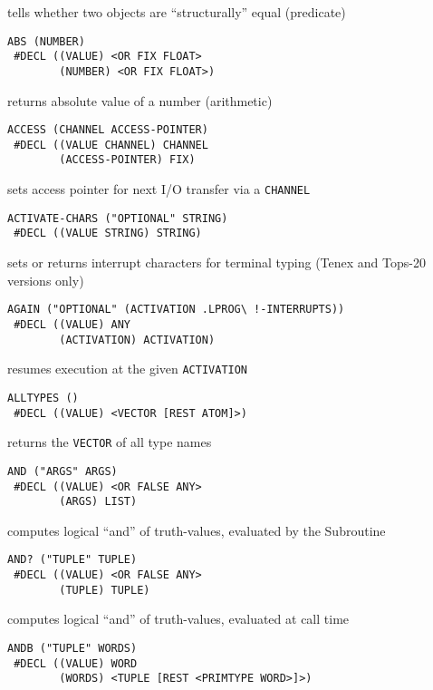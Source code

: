 \documentclass[a4paper]{scrbook}
\begin{document}
tells whether two objects are ``structurally'' equal (predicate)

\begin{verbatim}
ABS (NUMBER)
 #DECL ((VALUE) <OR FIX FLOAT>
        (NUMBER) <OR FIX FLOAT>)
\end{verbatim}

returns absolute value of a number (arithmetic)

\begin{verbatim}
ACCESS (CHANNEL ACCESS-POINTER)
 #DECL ((VALUE CHANNEL) CHANNEL
        (ACCESS-POINTER) FIX)
\end{verbatim}

sets access pointer for next I/O transfer via a \texttt{CHANNEL}

\begin{verbatim}
ACTIVATE-CHARS ("OPTIONAL" STRING)
 #DECL ((VALUE STRING) STRING)
\end{verbatim}

sets or returns interrupt characters for terminal typing (Tenex and Tops-20
versions only)

\begin{verbatim}
AGAIN ("OPTIONAL" (ACTIVATION .LPROG\ !-INTERRUPTS))
 #DECL ((VALUE) ANY
        (ACTIVATION) ACTIVATION)
\end{verbatim}

resumes execution at the given \texttt{ACTIVATION}

\begin{verbatim}
ALLTYPES ()
 #DECL ((VALUE) <VECTOR [REST ATOM]>)
\end{verbatim}

returns the \texttt{VECTOR} of all type names

\begin{verbatim}
AND ("ARGS" ARGS)
 #DECL ((VALUE) <OR FALSE ANY>
        (ARGS) LIST)
\end{verbatim}

computes logical ``and'' of truth-values, evaluated by the Subroutine

\begin{verbatim}
AND? ("TUPLE" TUPLE)
 #DECL ((VALUE) <OR FALSE ANY>
        (TUPLE) TUPLE)
\end{verbatim}

computes logical ``and'' of truth-values, evaluated at call time

\begin{verbatim}
ANDB ("TUPLE" WORDS)
 #DECL ((VALUE) WORD
        (WORDS) <TUPLE [REST <PRIMTYPE WORD>]>)
\end{verbatim}
\end{document}
